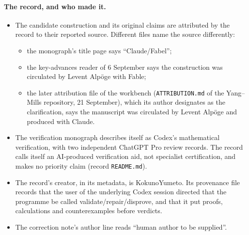 \paragraph{The record, and who made it.}
\begin{itemize}
\item The candidate construction and its original claims are attributed by the record to their reported source. Different files name the source differently:
\begin{itemize}
\item the monograph's title page says ``Claude/Fabel'';
\item the key-advances reader of 6 September says the construction was circulated by Levent Alpöge with Fable;
\item the later attribution file of the workbench (\texttt{ATTRIBUTION.md} of the Yang--Mills repository, 21 September), which its author designates as the clarification, says the manuscript was circulated by Levent Alpöge and produced with Claude.
\end{itemize}
\item The verification monograph describes itself as Codex's mathematical verification, with two independent ChatGPT Pro review records. The record calls itself an AI-produced verification aid, not specialist certification, and makes no priority claim (record \texttt{README.md}).
\item The record's creator, in its metadata, is KokunoYumeto. Its provenance file records that the user of the underlying Codex session directed that the programme be called validate/repair/disprove, and that it put proofs, calculations and counterexamples before verdicts.
\item The correction note's author line reads ``human author to be supplied''.
\end{itemize}

